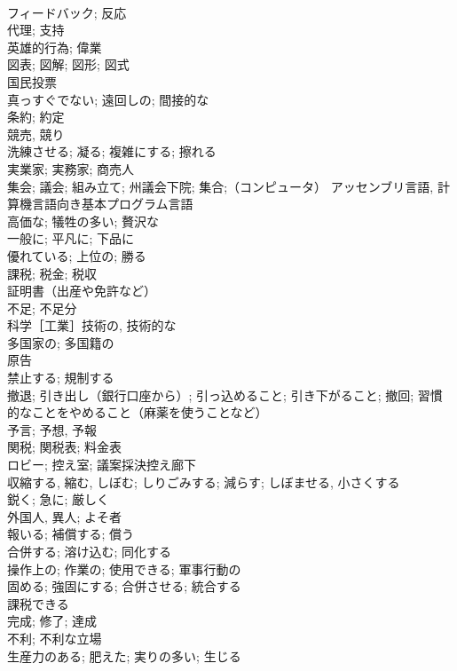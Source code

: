 \documentclass[8pt]{extreport}
\begin{document}
\begin{CJK}{UTF8}{min}
\\	フィードバック; 反応	
\\	代理; 支持	
\\	英雄的行為; 偉業	
\\	図表; 図解; 図形; 図式	
\\	国民投票	
\\	真っすぐでない; 遠回しの; 間接的な	
\\	条約; 約定	
\\	競売, 競り	
\\	洗練させる; 凝る; 複雑にする; 擦れる	
\\	実業家; 実務家; 商売人	
\\	集会; 議会; 組み立て; 州議会下院; 集合;（コンピュータ） アッセンブリ言語, 計算機言語向き基本プログラム言語	
\\	高価な; 犠牲の多い; 贅沢な	
\\	一般に; 平凡に; 下品に	
\\	優れている; 上位の; 勝る
\\	課税; 税金; 税収	
\\	証明書（出産や免許など）	
\\	不足; 不足分	
\\	科学［工業］技術の, 技術的な	
\\	多国家の; 多国籍の	
\\	原告	
\\	禁止する; 規制する	
\\	撤退; 引き出し（銀行口座から）; 引っ込めること; 引き下がること; 撤回; 習慣的なことをやめること（麻薬を使うことなど）	
\\	予言; 予想, 予報	
\\	関税; 関税表; 料金表	
\\	ロビー; 控え室; 議案採決控え廊下	
\\	収縮する, 縮む, しぼむ; しりごみする; 減らす; しぼませる, 小さくする	
\\	鋭く; 急に; 厳しく	
\\	外国人, 異人; よそ者	
\\	報いる; 補償する; 償う	
\\	合併する; 溶け込む; 同化する	
\\	操作上の; 作業の; 使用できる; 軍事行動の	
\\	固める; 強固にする; 合併させる; 統合する	
\\	課税できる	
\\	完成; 修了; 達成	
\\	不利; 不利な立場	
\\	生産力のある; 肥えた; 実りの多い; 生じる	

\end{CJK}
\end{document}
